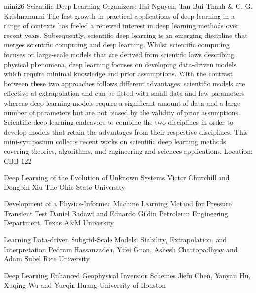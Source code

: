 \mini
{mini26}
{Scientific Deep Learning}
{Organizers: Hai Nguyen, Tan Bui-Thanh \& C. G. Krishnanunni}
{The fast growth in practical applications of deep learning in a range of contexts has fueled a renewed interest in deep learning methods over recent years. Subsequently, scientific deep learning is an emerging discipline that merges scientific computing and deep learning. Whilst scientific computing focuses on large-scale models that are derived from scientific laws describing physical phenomena, deep learning focuses on developing data-driven models which require minimal knowledge and prior assumptions. With the contrast between these two approaches follows different advantages: scientific models are effective at extrapolation and can be fitted with small data and few parameters whereas deep learning models require a significant amount of data and a large number of parameters but are not biased by the validity of prior assumptions. Scientific deep learning endeavors to combine the two disciplines in order to develop models that retain the advantages from their respective disciplines. This mini-symposium collects recent works on scientific deep learning methods covering theories, algorithms, and engineering and sciences applications.}
{Location: CBB 122}

\begin{talks}
\item\talk
{Deep Learning of the Evolution of Unknown Systems}
{Victor Churchill and Dongbin Xiu}
{The Ohio State University}
\item\talk
{Development of a Physics-Informed Machine Learning Method for Pressure Transient Test}
{Daniel Badawi and Eduardo Gildin}
{Petroleum Engineering Department, Texas A\&M University}
\item\talk
{Learning Data-driven Subgrid-Scale Models: Stability, Extrapolation, and Interpretation}
{Pedram Hassanzadeh, Yifei Guan, Ashesh Chattopadhyay and Adam Subel}
{Rice University}
\item\talk
{Deep Learning Enhanced Geophysical Inversion Schemes}
{Jiefu Chen, Yanyan Hu, Xuqing Wu and Yueqin Huang}
{University of Houston}
\end{talks}
\room
